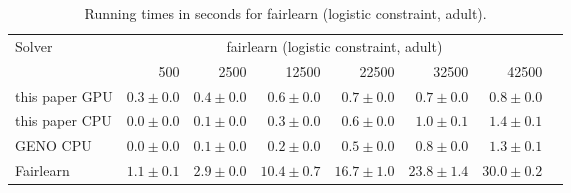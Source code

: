 
\begin{table}[h!]
  \begin{center}
{\small
  \begin{tabular}{l*{7}{r}}
    \toprule
    \multirow{2}{*}{Solver} & \multicolumn{6}{c}{fairlearn (logistic constraint, adult)} \\
    \cmidrule{2-7}
    & 500 & 2500 & 12500 & 22500 & 32500 & 42500 \\
    \midrule
    this paper GPU	& $0.3\pm 0.0$ &  $0.4\pm 0.0$ & $0.6\pm 0.0$ & $0.7\pm 0.0$ & $0.7\pm 0.0$ & $0.8\pm 0.0$ \\
    this paper CPU	& $0.0\pm 0.0$  & $0.1\pm 0.0$ & $0.3\pm 0.0$ & $0.6\pm 0.0$ & $1.0\pm 0.1$ & $1.4\pm 0.1$ \\
    GENO CPU		& $0.0\pm 0.0$ &  $0.1\pm 0.0$ & $0.2\pm 0.0$ & $0.5\pm 0.0$ &  $0.8\pm 0.0$ & $1.3\pm 0.1$ \\
    Fairlearn		& $1.1\pm 0.1$ & $2.9\pm 0.0$ & $10.4\pm 0.7$  & $16.7\pm 1.0$ & $23.8\pm 1.4$ & $30.0\pm 0.2$ \\
    \bottomrule
  \end{tabular}}
  \caption{Running times in seconds for fairlearn (logistic constraint, adult).}
  \end{center}
\end{table}
